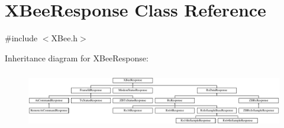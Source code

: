 \hypertarget{classXBeeResponse}{\section{\-X\-Bee\-Response \-Class \-Reference}
\label{classXBeeResponse}
}


{\ttfamily \#include $<$\-X\-Bee.\-h$>$}

\-Inheritance diagram for \-X\-Bee\-Response\-:\begin{figure}[H]
\begin{center}
\leavevmode
\includegraphics[height=2.550091cm]{classXBeeResponse}
\end{center}
\end{figure}
